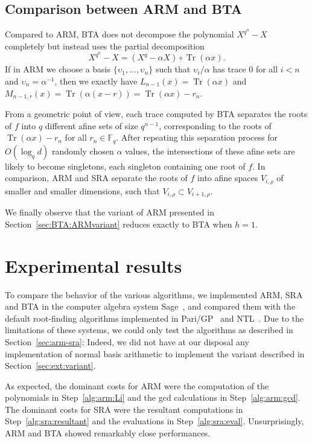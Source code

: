 \documentclass{sig-alternate}
\newcommand{\ff}[1]{\mathbb{F}_{#1}}
\newcommand{\fq}{\ff{q}}
\newcommand{\dd}{d}
\newcommand{\qq}{q}
\newcommand{\nn}{n}
\DeclareMathOperator{\Tr}{Tr}
\newcounter{algo}
\begin{document}
\subsection{Comparison between ARM and BTA}

Compared to ARM, BTA does not decompose the polynomial $X^{\qq^\nn}-X$ completely but instead uses the partial decomposition
$$X^{\qq^\nn}-X=(X^\qq-\alpha X)\circ\Tr(\alpha x).$$
If in ARM we choose a basis $\{\upsilon_1,\ldots,\upsilon_{\nn}\}$ such that $\upsilon_i/\alpha$ has trace 0 for all $i<\nn$ and $\upsilon_\nn=\alpha^{-1}$, then we exactly have $L_{\nn-1}(x)=\Tr(\alpha x)$ and $M_{\nn-1,r}(x)=\Tr(\alpha (x-r))=\Tr(\alpha x)-r_\nn$.

From a geometric point of view, each trace computed by BTA separates the roots of $f$ into $q$ different afine sets of size $\qq^{\nn-1}$, corresponding to the roots of $\Tr(\alpha x)-r_\nn$ for all $r_\nn\in\fq$. After repeating this separation process for $O(\log_\qq\dd)$  randomly chosen $\alpha$ values, the intersections of these afine sets are likely to become singletons, each singleton containing one root of $f$. 
%
In comparison, ARM and SRA separate the roots of $f$ into afine spaces $V_{i,\rho}$ of smaller and smaller dimensions, such that $V_{i,\rho}\subset V_{i+1,\rho}$. 

We finally observe that the variant of ARM presented in Section~\ref{sec:BTA:ARMvariant} reduces exactly to BTA when $h=1$.





\section{Experimental results}

To compare the behavior of the various algorithms, we implemented ARM,
SRA and BTA in the computer algebra system Sage~\cite{Sage}, and
compared them with the default root-finding algorithms implemented in
Pari/GP~\cite{Pari} and NTL~\cite{ntl}. Due to the limitations of
these systems, we could only test the algorithms as described in
Section~\ref{sec:arm-sra}: Indeed, we did not have at our disposal any
implementation of normal basis arithmetic to implement the variant
described in Section~\ref{sec:ext:variant}.

As expected, the dominant costs for ARM were the computation of the
polynomials in Step~\ref{alg:arm:Li} and the gcd calculations in
Step~\ref{alg:arm:gcd}. The dominant costs for SRA were the resultant
computations in Step~\ref{alg:sra:resultant} and the evaluations in
Step~\ref{alg:sra:eval}. Unsurprisingly, ARM and BTA showed remarkably
close performances.
\end{document}
